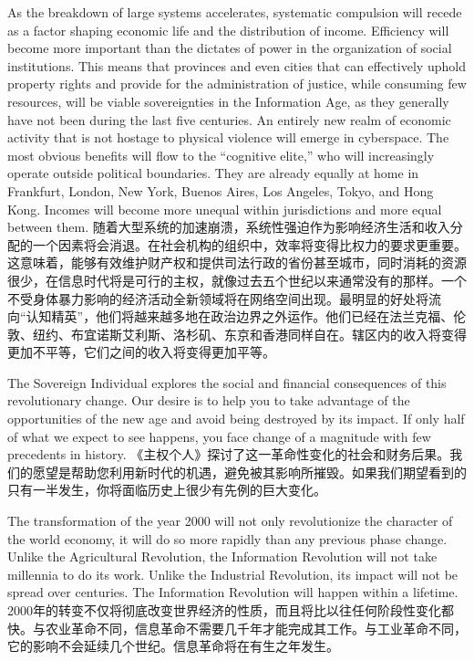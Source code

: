 \begin{paracol}{2}[]
As the breakdown of large systems accelerates, systematic compulsion will recede as a factor shaping economic life and the distribution of income. Efficiency will become more important than the dictates of power in the organization of social institutions. This means that provinces and even cities that can effectively uphold property rights and provide for the administration of justice, while consuming few resources, will be viable sovereignties in the Information Age, as they generally have not been during the last five centuries. An entirely new realm of economic activity that is not hostage to physical violence will emerge in cyberspace. The most obvious benefits will flow to the “cognitive elite,” who will increasingly operate outside political boundaries. They are already equally at home in Frankfurt, London, New York, Buenos Aires, Los Angeles, Tokyo, and Hong Kong. Incomes will become more unequal
within jurisdictions and more equal between them.
\switchcolumn
随着大型系统的加速崩溃，系统性强迫作为影响经济生活和收入分配的一个因素将会消退。在社会机构的组织中，效率将变得比权力的要求更重要。这意味着，能够有效维护财产权和提供司法行政的省份甚至城市，同时消耗的资源很少，在信息时代将是可行的主权，就像过去五个世纪以来通常没有的那样。一个不受身体暴力影响的经济活动全新领域将在网络空间出现。最明显的好处将流向“认知精英”，他们将越来越多地在政治边界之外运作。他们已经在法兰克福、伦敦、纽约、布宜诺斯艾利斯、洛杉矶、东京和香港同样自在。辖区内的收入将变得更加不平等，它们之间的收入将变得更加平等。
\end{paracol}

\begin{paracol}{2}[]
The Sovereign Individual explores the social and financial consequences of this revolutionary change. Our desire is to help you to take advantage of the opportunities of the new age and avoid being destroyed by its impact. If only half of what we expect to see happens, you face change of a magnitude with few precedents in history.
\switchcolumn
《主权个人》探讨了这一革命性变化的社会和财务后果。我们的愿望是帮助您利用新时代的机遇，避免被其影响所摧毁。如果我们期望看到的只有一半发生，你将面临历史上很少有先例的巨大变化。
\end{paracol}

\begin{paracol}{2}[]
The transformation of the year 2000 will not only revolutionize the character of the world economy, it will do so more rapidly than any previous phase change. Unlike the Agricultural Revolution, the Information Revolution will not take millennia to do its work. Unlike the Industrial Revolution, its impact will not be spread over centuries. The Information Revolution will happen within a lifetime.
\switchcolumn
2000年的转变不仅将彻底改变世界经济的性质，而且将比以往任何阶段性变化都快。与农业革命不同，信息革命不需要几千年才能完成其工作。与工业革命不同，它的影响不会延续几个世纪。信息革命将在有生之年发生。
\end{paracol}


